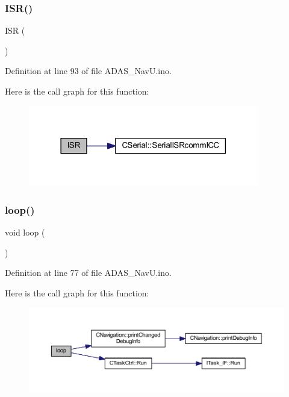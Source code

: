 \subsubsection{\texorpdfstring{ISR()}{ISR()}\hspace{0.1cm}{\footnotesize\ttfamily [2/2]}}
{\footnotesize\ttfamily I\+SR (\begin{DoxyParamCaption}\item[{U\+S\+A\+R\+T2\+\_\+\+R\+X\+\_\+vect}]{ }\end{DoxyParamCaption})}



Definition at line 93 of file A\+D\+A\+S\+\_\+\+Nav\+U.\+ino.

Here is the call graph for this function\+:
\nopagebreak
\begin{figure}[H]
\begin{center}
\leavevmode
\includegraphics[width=285pt]{_a_d_a_s___nav_u_8ino_a63a86aad9ba2e355fe6380da553f554e_cgraph}
\end{center}
\end{figure}
\mbox{\label{_a_d_a_s___nav_u_8ino_afe461d27b9c48d5921c00d521181f12f}} 
\subsubsection{\texorpdfstring{loop()}{loop()}}
{\footnotesize\ttfamily void loop (\begin{DoxyParamCaption}{ }\end{DoxyParamCaption})}



Definition at line 77 of file A\+D\+A\+S\+\_\+\+Nav\+U.\+ino.

Here is the call graph for this function\+:
\nopagebreak
\begin{figure}[H]
\begin{center}
\leavevmode
\includegraphics[width=350pt]{_a_d_a_s___nav_u_8ino_afe461d27b9c48d5921c00d521181f12f_cgraph}
\end{center}
\end{figure}
\mbox{\label{_a_d_a_s___nav_u_8ino_a4fc01d736fe50cf5b977f755b675f11d}} 

